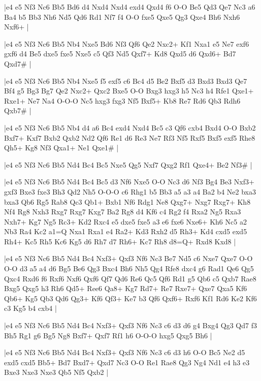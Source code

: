 \whitename{}
\blackname{}
\makegametitle
|e4 e5 Nf3 Nc6 Bb5 Bd6 d4 Nxd4 Nxd4 exd4 Qxd4 f6 O-O Be5 Qd3 Qe7 Nc3 a6 Ba4 b5 Bb3 Nh6 Nd5 Qd6 Rd1 Nf7 f4 O-O fxe5 Qxe5 Qg3 Qxe4 Bh6 Nxh6 Nxf6+  |

\whitename{}
\blackname{}
\makegametitle
|e4 e5 Nf3 Nc6 Bb5 Nb4 Nxe5 Bd6 Nf3 Qf6 Qe2 Nxc2+ Kf1 Nxa1 e5 Ne7 exf6 gxf6 d4 Be5 dxe5 fxe5 Nxe5 c5 Qf3 Nd5 Qxf7+ Kd8 Qxd5 d6 Qxd6+ Bd7 Qxd7\#  |

\whitename{}
\blackname{}
\makegametitle
|e4 e5 Nf3 Nc6 Bb5 Nb4 Nxe5 f5 exf5 c6 Bc4 d5 Be2 Bxf5 d3 Bxd3 Bxd3 Qe7 Bf4 g5 Bg3 Bg7 Qe2 Nxc2+ Qxc2 Bxe5 O-O Bxg3 hxg3 h5 Nc3 h4 Rfe1 Qxe1+ Rxe1+ Ne7 Na4 O-O-O Nc5 hxg3 fxg3 Nf5 Bxf5+ Kb8 Re7 Rd6 Qb3 Rdh6 Qxb7\#  |

\whitename{}
\blackname{}
\makegametitle
|e4 e5 Nf3 Nc6 Bb5 Nb4 d4 a6 Bc4 exd4 Nxd4 Bc5 c3 Qf6 cxb4 Bxd4 O-O Bxb2 Bxf7+ Kxf7 Bxb2 Qxb2 Nd2 Qf6 Re1 d6 Re3 Ne7 Rf3 Nf5 Rxf5 Bxf5 exf5 Rhe8 Qh5+ Kg8 Nf3 Qxa1+ Ne1 Qxe1\#  |

\whitename{}
\blackname{}
\makegametitle
|e4 e5 Nf3 Nc6 Bb5 Nd4 Bc4 Bc5 Nxe5 Qg5 Nxf7 Qxg2 Rf1 Qxe4+ Be2 Nf3\#  |

\whitename{}
\blackname{}
\makegametitle
|e4 e5 Nf3 Nc6 Bb5 Nd4 Bc4 Bc5 d3 Nf6 Nxe5 O-O Nc3 d6 Nf3 Bg4 Be3 Nxf3+ gxf3 Bxe3 fxe3 Bh3 Qd2 Nh5 O-O-O c6 Rhg1 b5 Bb3 a5 a3 a4 Ba2 b4 Ne2 bxa3 bxa3 Qb6 Rg5 Rab8 Qc3 Qb1+ Bxb1 Nf6 Rdg1 Ne8 Qxg7+ Nxg7 Rxg7+ Kh8 Nf4 Rg8 Nxh3 Rxg7 Rxg7 Kxg7 Ba2 Rg8 d4 Kf6 c4 Rg2 f4 Rxa2 Ng5 Rxa3 Nxh7+ Kg7 Ng5 Rc3+ Kd2 Rxc4 e5 dxe5 fxe5 a3 e6 fxe6 Nxe6+ Kh6 Nc5 a2 Nb3 Ra4 Kc2 a1=Q Nxa1 Rxa1 e4 Ra2+ Kd3 Rxh2 d5 Rh3+ Kd4 cxd5 exd5 Rh4+ Kc5 Rh5 Kc6 Kg5 d6 Rh7 d7 Rh6+ Kc7 Rh8 d8=Q+ Rxd8 Kxd8  |

\whitename{}
\blackname{}
\makegametitle
|e4 e5 Nf3 Nc6 Bb5 Nd4 Bc4 Nxf3+ Qxf3 Nf6 Nc3 Be7 Nd5 c6 Nxe7 Qxe7 O-O O-O d3 a5 a4 d6 Bg5 Be6 Qg3 Bxc4 Bh6 Nh5 Qg4 Rfe8 dxc4 g6 Rad1 Qe6 Qg5 Qxc4 Rxd6 f6 Rxf6 Nxf6 Qxf6 Qf7 Qd6 Re6 Qc5 Qf6 Rd1 g5 Qb6 c5 Qxb7 Rae8 Bxg5 Qxg5 h3 Rh6 Qd5+ Ree6 Qa8+ Kg7 Rd7+ Re7 Rxe7+ Qxe7 Qxa5 Kf6 Qb6+ Kg5 Qb3 Qd6 Qg3+ Kf6 Qf3+ Ke7 b3 Qf6 Qxf6+ Rxf6 Kf1 Rd6 Ke2 Kf6 c3 Kg5 b4 cxb4  |

\whitename{}
\blackname{}
\makegametitle
|e4 e5 Nf3 Nc6 Bb5 Nd4 Bc4 Nxf3+ Qxf3 Nf6 Nc3 c6 d3 d6 g4 Bxg4 Qg3 Qd7 f3 Bh5 Rg1 g6 Bg5 Ng8 Bxf7+ Qxf7 Rf1 h6 O-O-O hxg5 Qxg5 Bh6  |

\whitename{}
\blackname{}
\makegametitle
|e4 e5 Nf3 Nc6 Bb5 Nd4 Bc4 Nxf3+ Qxf3 Nf6 Nc3 c6 d3 h6 O-O Bc5 Ne2 d5 exd5 cxd5 Bb5+ Bd7 Bxd7+ Qxd7 Nc3 O-O Re1 Rae8 Qg3 Ng4 Nd1 e4 h3 e3 Bxe3 Nxe3 Nxe3 Qb5 Nf5 Qxb2  |

